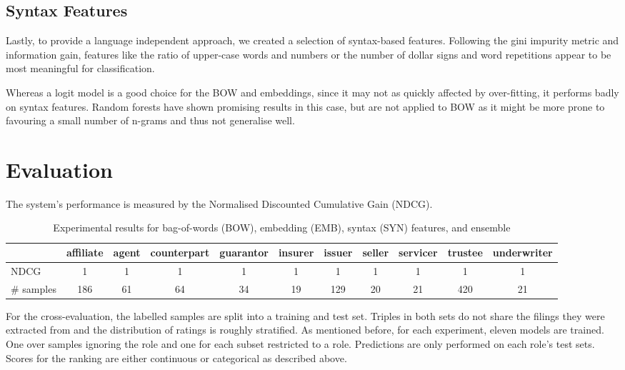 \subsection{Syntax Features}
Lastly, to provide a language independent approach, we created a selection of syntax-based features.
Following the gini impurity metric and information gain, features like the ratio of upper-case words and numbers or the number of dollar signs and word repetitions appear to be most meaningful for classification.

Whereas a logit model is a good choice for the BOW and embeddings, since it may not as quickly affected by over-fitting, it performs badly on syntax features.
Random forests have shown promising results in this case, but are not applied to BOW as it might be more prone to favouring a small number of n-grams and thus not generalise well.


\section{Evaluation}
The system's performance is measured by the Normalised Discounted Cumulative Gain (NDCG)\cite{ir}.

\begin{table*}
	\caption{Experimental results for bag-of-words (BOW), embedding (EMB), syntax (SYN) features, and ensemble}
	\label{tab:roleresults}
	\begin{tabular}{lcccccccccc}
		\toprule
		          & affiliate & agent & counterpart & guarantor & insurer & issuer & seller & servicer & trustee & underwriter \\
		\midrule
		NDCG & 1 & 1 & 1 & 1 & 1 & 1 & 1 & 1 & 1 & 1 \\
	  \# samples & 186       & 61    & 64          & 34        & 19      & 129    & 20     & 21       & 420     & 21          \\
		\bottomrule
	\end{tabular}
\end{table*}

For the cross-evaluation, the labelled samples are split into a training and test set.
Triples in both sets do not share the filings they were extracted from and the distribution of ratings is roughly stratified.
As mentioned before, for each experiment, eleven models are trained. One over samples ignoring the role and one for each subset restricted to a role.
Predictions are only performed on each role's test sets.
Scores for the ranking are either continuous or categorical as described above.

